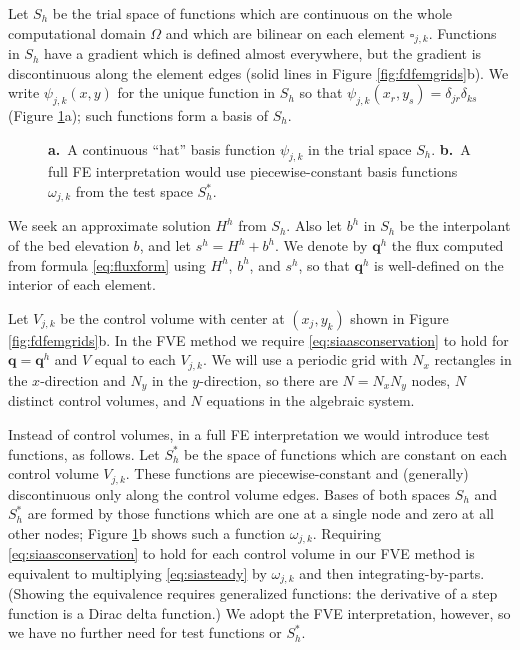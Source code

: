 \documentclass[twocolumn,letterpaper]{igs}
\newcommand\bq{\mathbf{q}}
\begin{document}
Let $S_h$ be the trial space of functions which are continuous on the whole computational domain $\Omega$ and which are bilinear on each element $\square_{j,k}$.  Functions in $S_h$ have a gradient which is defined almost everywhere, but the gradient is discontinuous along the element edges (solid lines in Figure \ref{fig:fdfemgrids}b).  We write $\psi_{j,k}(x,y)$ for the unique function in $S_h$ so that $\psi_{j,k}(x_r,y_s) = \delta_{jr} \delta_{ks}$ (Figure \ref{fig:fembases}a); such functions form a basis of $S_h$.

\begin{figure}[ht]
\begin{center}
 \quad 
\end{center}
\caption{\textbf{a.}~A continuous ``hat'' basis function $\psi_{j,k}$ in the trial space $S_h$.  \textbf{b.}~A full FE interpretation would use piecewise-constant basis functions $\omega_{j,k}$ from the test space $S_h^*$.}
\label{fig:fembases}
\end{figure}

We seek an approximate solution $H^h$ from $S_h$.  Also let $b^h$ in $S_h$ be the interpolant of the bed elevation $b$, and let $s^h=H^h+b^h$.  We denote by $\bq^h$ the flux computed from formula \eqref{eq:fluxform} using $H^h$, $b^h$, and $s^h$, so that $\bq^h$ is well-defined on the interior of each element.

Let $V_{j,k}$ be the control volume with center at $(x_j,y_k)$ shown in Figure \ref{fig:fdfemgrids}b.  In the FVE method we require \eqref{eq:siaasconservation} to hold for $\bq=\bq^h$ and $V$ equal to each $V_{j,k}$.  We will use a periodic grid with $N_x$ rectangles in the $x$-direction and $N_y$ in the $y$-direction, so there are $N=N_xN_y$ nodes, $N$ distinct control volumes, and $N$ equations in the algebraic system.

Instead of control volumes, in a full FE interpretation we would introduce test functions, as follows.  Let $S_h^*$ be the space of functions which are constant on each control volume $V_{j,k}$.  These functions are piecewise-constant and (generally) discontinuous only along the control volume edges.  Bases of both spaces $S_h$ and $S_h^*$ are formed by those functions which are one at a single node and zero at all other nodes; Figure \ref{fig:fembases}b shows such a function $\omega_{j,k}$.  Requiring \eqref{eq:siaasconservation} to hold for each control volume in our FVE method is equivalent to multiplying \eqref{eq:siasteady} by $\omega_{j,k}$ and then integrating-by-parts.  (Showing the equivalence requires generalized functions: the derivative of a step function is a Dirac delta function.)  We adopt the FVE interpretation, however, so we have no further need for test functions or $S_h^*$.
\end{document}

